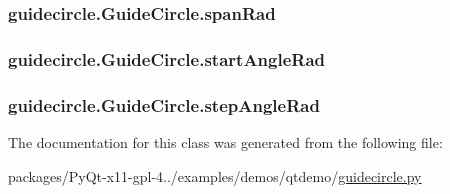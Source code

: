 \subsubsection[{span\+Rad}]{\setlength{\rightskip}{0pt plus 5cm}guidecircle.\+Guide\+Circle.\+span\+Rad}\label{classguidecircle_1_1GuideCircle_a4d91ff57445471f8783b4c7272ebbb7f}
\hypertarget{classguidecircle_1_1GuideCircle_afdb8bd566f7bc0f1a7a34becec280af9}{}
\subsubsection[{start\+Angle\+Rad}]{\setlength{\rightskip}{0pt plus 5cm}guidecircle.\+Guide\+Circle.\+start\+Angle\+Rad}\label{classguidecircle_1_1GuideCircle_afdb8bd566f7bc0f1a7a34becec280af9}
\hypertarget{classguidecircle_1_1GuideCircle_a76d99fe4ff08b112b80362de30bc9b94}{}
\subsubsection[{step\+Angle\+Rad}]{\setlength{\rightskip}{0pt plus 5cm}guidecircle.\+Guide\+Circle.\+step\+Angle\+Rad}\label{classguidecircle_1_1GuideCircle_a76d99fe4ff08b112b80362de30bc9b94}


The documentation for this class was generated from the following file\+:\begin{DoxyCompactItemize}
\item 
packages/\+Py\+Qt-\/x11-\/gpl-\/4../examples/demos/qtdemo/\hyperlink{guidecircle_8py}{guidecircle.\+py}\end{DoxyCompactItemize}
